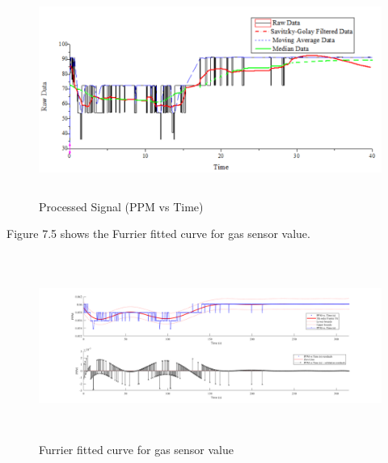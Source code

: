 \begin{enumerate}[label=\roman*]

\begin{figure}[H]
	\begin{Center}
		\includegraphics[width=6.5in,height=2.72in]{18}
		\caption{Processed Signal (PPM vs Time)}
		\label{fig:_4_Processed_Signal_PPM_vs_Time}
	\end{Center}
\end{figure}



\setlength{\parskip}{0.0pt}
\par

\par


\vspace{\baselineskip}

\vspace{\baselineskip}

\vspace{\baselineskip}
\begin{justify}
Figure 7.5 shows the Furrier fitted curve for gas sensor value.
\end{justify}\par




\begin{figure}[H]
  \centering
  \includegraphics[width=6.5in,height=2.38in]{19}
  \caption{Furrier fitted curve for gas sensor value}\label{fig19}
\end{figure}



\end{enumerate}
